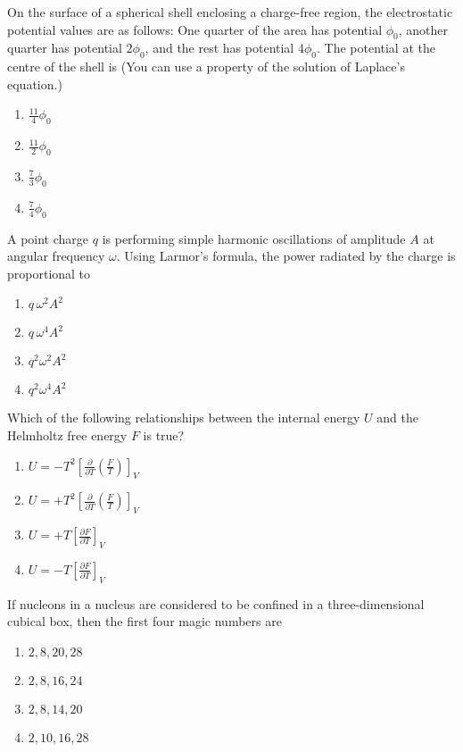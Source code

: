     \item On the surface of a spherical shell enclosing a charge-free region, the electrostatic potential values are as follows: One quarter of the area has potential $\phi_0$, another quarter has potential $2\phi_0$, and the rest has potential $4\phi_0$. The potential at the centre of the shell is
    (You can use a property of the solution of Laplace's equation.)
    \begin{enumerate}
        \item $\frac{11}{4} \phi_0$
        \item $\frac{11}{2} \phi_0$
        \item $\frac{7}{3} \phi_0$
        \item $\frac{7}{4} \phi_0$
    \end{enumerate}
    \item A point charge $q$ is performing simple harmonic oscillations of amplitude $A$ at angular frequency $\omega$. Using Larmor's formula, the power radiated by the charge is proportional to
\begin{enumerate}
    \item $q \, \omega^2 A^2$
    \item $q \, \omega^4 A^2$
    \item $q^2 \omega^2 A^2$
    \item $q^2 \omega^4 A^2$
\end{enumerate}
\item Which of the following relationships between the internal energy $U$ and the Helmholtz free energy $F$ is true?
\begin{enumerate}
    \item $U = -T^2 \left[ \frac{\partial}{\partial T} \left( \frac{F}{T} \right) \right]_V$
    \item $U = +T^2 \left[ \frac{\partial}{\partial T} \left( \frac{F}{T} \right) \right]_V$
    \item $U = +T \left[ \frac{\partial F}{\partial T} \right]_V$
    \item $U = -T \left[ \frac{\partial F}{\partial T} \right]_V$
\end{enumerate}
\item If nucleons in a nucleus are considered to be confined in a three-dimensional cubical box, then the first four magic numbers are
\begin{enumerate}
    \item$2, 8, 20, 28$
    \item $2, 8, 16, 24$
    \item $2, 8, 14, 20$
    \item $2, 10, 16, 28$
\end{enumerate}

